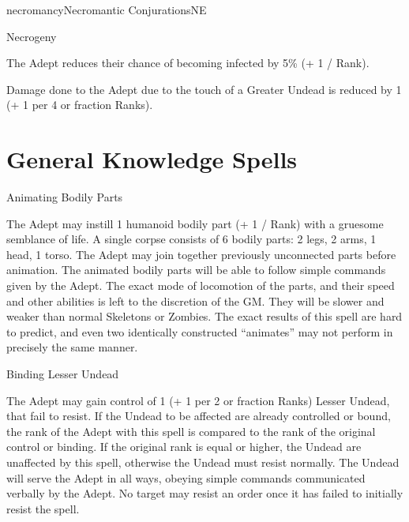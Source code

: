\begin{College}[1.1]{necromancy}{Necromantic Conjurations}{NE}
\begin{talent}[T-3]{Necrogeny}
\begin{effects}
\begin{Description}
\item[Infection] The Adept reduces their chance of becoming infected
  by 5\% (+ 1 / Rank).

\item[Undead Draining] Damage done to the Adept due to the touch of a
Greater Undead is reduced by 1 (+ 1 per 4 or fraction Ranks).
\end{Description}
\end{effects}
\end{talent}

\section{General Knowledge Spells}

\begin{spell}[G-1]{Animating Bodily Parts}
\begin{effects}
The Adept may instill 1 humanoid bodily part (+ 1 / Rank) with a
gruesome semblance of life.  A single corpse consists of 6 bodily
parts: 2 legs, 2 arms, 1 head, 1 torso.  The Adept may join together
previously unconnected parts before animation.  The animated bodily
parts will be able to follow simple commands given by the Adept.  The
exact mode of locomotion of the parts, and their speed and other
abilities is left to the discretion of the GM.  They will be slower
and weaker than normal Skeletons or Zombies. The exact results of this
spell are hard to predict, and even two identically constructed
“animates” may not perform in precisely the same manner.
\end{effects}
\end{spell}

\begin{spell}[G-2]{Binding Lesser Undead}
\begin{effects}
The Adept may gain control of 1 (+ 1 per 2 or fraction Ranks) Lesser
Undead, that fail to resist.  If the Undead to be affected are already
controlled or bound, the rank of the Adept with this spell is compared
to the rank of the original control or binding.  If the original rank
is equal or higher, the Undead are unaffected by this spell, otherwise
the Undead must resist normally. The Undead will serve the Adept in
all ways, obeying simple commands communicated verbally by the Adept.
No target may resist an order once it has failed to initially resist
the spell.
\end{effects}
\end{spell}


\end{College}
